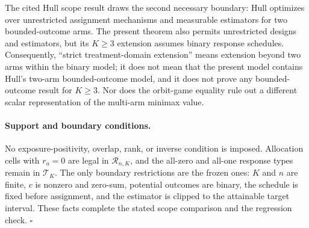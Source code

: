 The cited Hull scope result draws the second necessary boundary: Hull optimizes over unrestricted assignment mechanisms and measurable estimators for two bounded-outcome arms.  The present theorem also permits unrestricted designs and estimators, but its \(K\geq3\) extension assumes binary response schedules.  Consequently, ``strict treatment-domain extension'' means extension beyond two arms within the binary model; it does not mean that the present model contains Hull's two-arm bounded-outcome model, and it does not prove any bounded-outcome result for \(K\geq3\).  Nor does the orbit-game equality rule out a different scalar representation of the multi-arm minimax value.

\paragraph{Support and boundary conditions.}
No exposure-positivity, overlap, rank, or inverse condition is imposed.  Allocation cells with \(r_a=0\) are legal in \(\mathcal R_{n,K}\), and the all-zero and all-one response types remain in \(\mathcal T_K\).  The only boundary restrictions are the frozen ones: \(K\) and \(n\) are finite, \(c\) is nonzero and zero-sum, potential outcomes are binary, the schedule is fixed before assignment, and the estimator is clipped to the attainable target interval.  These facts complete the stated scope comparison and the regression check. \(\square\)